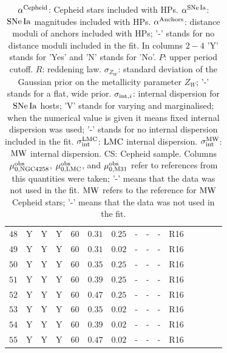 \begin{table}[tbp]
{\begin{tabular}{lcccccccccccccr}
\rule[-1ex]{0pt}{2.5ex} $48$ & Y & Y & Y & $60$ & $0.31 $ & $0.25$ & - & - & - & R16 & \cite{Riess:2016jrr} & \cite{Pietrzynski:2013gia} & \cite{Riess:2016jrr} & \cite{Riess:2016jrr} \\ 
\rule[-1ex]{0pt}{2.5ex} $49$ & Y & Y & Y & $60$ & $0.31 $ & $0.02$ & - & - & - & R16 & \cite{Riess:2016jrr} & \cite{Pietrzynski:2013gia} & \cite{Riess:2016jrr} & \cite{Riess:2016jrr} \\
\rule[-1ex]{0pt}{2.5ex} $50$ & Y & Y & Y & $60$ & $0.35 $ & $0.25$ & - & - & - & R16 & \cite{Riess:2016jrr} & \cite{Pietrzynski:2013gia} & \cite{Riess:2016jrr} & \cite{Riess:2016jrr} \\
\rule[-1ex]{0pt}{2.5ex} $51$ & Y & Y & Y & $60$ & $0.39 $ & $0.25$ & - & - & - & R16 & \cite{Riess:2016jrr} & \cite{Pietrzynski:2013gia} & \cite{Riess:2016jrr} & \cite{Riess:2016jrr} \\
\rule[-1ex]{0pt}{2.5ex} $52$ & Y & Y & Y & $60$ & $0.47 $ & $0.25$ & - & - & - & R16 & \cite{Riess:2016jrr} & \cite{Pietrzynski:2013gia} & \cite{Riess:2016jrr} & \cite{Riess:2016jrr} \\
\rule[-1ex]{0pt}{2.5ex} $53$ & Y & Y & Y & $60$ & $0.35 $ & $0.02$ & - & - & - & R16 & \cite{Riess:2016jrr} & \cite{Pietrzynski:2013gia} & \cite{Riess:2016jrr} & \cite{Riess:2016jrr} \\
\rule[-1ex]{0pt}{2.5ex} $54$ & Y & Y & Y & $60$ & $0.39 $ & $0.02$ & - & - & - & R16 & \cite{Riess:2016jrr} & \cite{Pietrzynski:2013gia} & \cite{Riess:2016jrr} & \cite{Riess:2016jrr} \\
\rule[-1ex]{0pt}{2.5ex} $55$ & Y & Y & Y & $60$ & $0.47 $ & $0.02$ & - & - & - & R16 & \cite{Riess:2016jrr} & \cite{Pietrzynski:2013gia} & \cite{Riess:2016jrr} & \cite{Riess:2016jrr} \\
\hline
\end{tabular}}
\caption{$\alpha^{\mathrm{Cepheid}}$: Cepheid stars included with HPs. $\alpha^{\mathrm{SNe\,Ia}}$: $\mathrm{SNe\,Ia}$ magnitudes included with HPs. $\alpha^{\mathrm{Anchors}}$: distance moduli of anchors included with HPs; '-' stands for no distance moduli included in the fit. In columns $2-4$ 'Y' stands for 'Yes' and 'N' stands for 'No'. $P$: upper period cutoff. $R$: reddening law. $\sigma_{Z_W}$: standard deviation of the Gaussian prior on the metallicity parameter $Z_W$; '-' stands for a flat, wide prior. $\sigma_{\mathrm{int},i}$: internal dispersion for $\mathrm{SNe\,Ia}$ hosts; 'V' stands for varying and marginalised; when the numerical value is given it means fixed internal dispersion was used; '-' stands for no internal dispersion included in the fit. $\sigma_{\mathrm{int}}^{\mathrm{LMC}}$: $\mathrm{LMC}$ internal dispersion. $\sigma_{\mathrm{int}}^{\mathrm{MW}}$: $\mathrm{MW}$ internal dispersion. CS: Cepheid sample. Columns $\mu_{0,\mathrm{NGC4258}}^{\mathrm{obs}}$, $\mu_{0,\mathrm{LMC}}^{\mathrm{obs}}$, and $\mu_{0,\mathrm{M31}}^{\mathrm{obs}}$ refer to references from this quantities were taken; '-' means that the data was not used in the fit. $\mathrm{MW}$ refers to the reference for $\mathrm{MW}$ Cepheid stars; '-' means that the data was not used in the fit. \label{Table:details-fits}}
\end{table}

